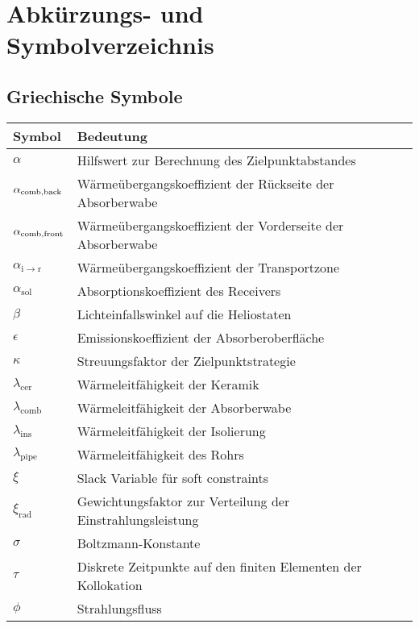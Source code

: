 \chapter*{Abkürzungs- und Symbolverzeichnis}
\renewcommand{\arraystretch}{1.5}
%

\vspace*{-1cm}
\section*{Griechische Symbole}
\begin{table}[ht!]
    \centering
\begin{tabular}{m{}m{}}
        \rowcolor{white}
Symbol   & Bedeutung          \\
        \midrule
$\alpha$ & Hilfswert zur Berechnung des Zielpunktabstandes     \\
$\alpha_{\mathrm{comb},\mathrm{back}}$ & Wärmeübergangskoeffizient der Rückseite der Absorberwabe     \\
$\alpha_{\mathrm{comb},\mathrm{front}}$ & Wärmeübergangskoeffizient der Vorderseite der Absorberwabe      \\
$\alpha_{\mathrm{i\to r}}$ & Wärmeübergangskoeffizient der Transportzone     \\
$\alpha_{\mathrm{sol}}$ & Absorptionskoeffizient des Receivers    \\
$\beta$ & Lichteinfallswinkel auf die Heliostaten \\
$\epsilon$ & Emissionskoeffizient der Absorberoberfläche \\
$\kappa$ & Streuungsfaktor der Zielpunktstrategie \\
$\lambda_{\mathrm{cer}}$ & Wärmeleitfähigkeit der Keramik \\
$\lambda_{\mathrm{comb}}$ & Wärmeleitfähigkeit der Absorberwabe  \\
$\lambda_{\mathrm{ins}}$ & Wärmeleitfähigkeit der Isolierung   \\
$\lambda_{\mathrm{pipe}}$ & Wärmeleitfähigkeit des Rohrs   \\
$\xi$ & Slack Variable für soft constraints   \\
$\xi_{\mathrm{rad}}$ & Gewichtungsfaktor zur Verteilung der Einstrahlungsleistung  \\
$\sigma$ & Boltzmann-Konstante   \\
$\tau$ & Diskrete Zeitpunkte auf den finiten Elementen der Kollokation   \\
$\phi$ & Strahlungsfluss   \\
    \end{tabular}
\end{table}
\clearpage
\newpage \vspace*{-1cm}

